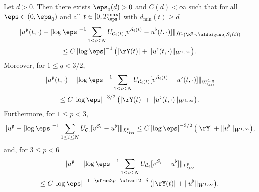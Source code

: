 \begin{Proposition} \label{pro:u^p.U}
Let $d>0$. Then there exists $\eps_0(d) > 0$ and $C(d) < \infty$ such that for all $\eps \in (0,\eps_0)$ and all $t \in [0,T_\eps^{\max}]$
with $d_{\min}(t) \geq d$
\begin{multline} \label{est:fluid.velocities.-1}
\|u^\mathfrak{p}(t,\cdot) - \left|\log \eps\right|^{-1} \sum_{1 \leq i \leq N} U_{\mathcal C_i(t)}[v^{{\mathcal S}_i(t)} - u^\flat(t,\cdot)]\|_{\dot H^{1} (\R^3 \smallsetminus \oldbigcup_i {\mathcal S}_i(t)) }
\\
\leq C \left|\log \eps\right|^{-1} \big(|\rY(t)|_{} + \|u^\flat(t,\cdot)\|_{W^{1,\infty}} \big).
\end{multline}
Moreover, for $1 \leq q < 3/2$,
\begin{multline} \label{est:fluid.velocities.0}
\|u^\mathfrak{p}(t,\cdot) - \left|\log \eps\right|^{-1} \sum_{1 \leq i \leq N} U_{\mathcal C_i(t)}[v^{{\mathcal S}_i(t)} - u^\flat(t,\cdot)]\|_{W^{1,q}_{\loc}}
\\ \leq C \left|\log \eps\right|^{-3/2} \big(|\rY(t)|_{} + \|u^\flat(t,\cdot)\|_{W^{1,\infty}} \big).
\end{multline}
Furthermore, for $1 \leq p< 3$,
\begin{equation} \label{est:fluid.velocities.1}
\|u^\mathfrak{p} - \left|\log \eps\right|^{-1} \sum_{1 \leq i \leq N} U_{\mathcal C_i}[v^{{\mathcal S}_i} - u^\flat]\|_{L^p_{\loc}} \leq C \left|\log \eps\right|^{-3/2} \big(|\rY|_{} + \|u^\flat\|_{W^{1,\infty}} \big),
\end{equation}
and, for $3 \leq p < 6$
\begin{multline} \label{est:fluid.velocities.comment}
\|u^\mathfrak{p} - \left|\log \eps\right|^{-1} \sum_{1 \leq i \leq N} U_{\mathcal C_i}[v^{{\mathcal S}_i} - u^\flat]\|_{L^p_{\loc}}\\
\leq C \left|\log \eps\right|^{-1 + {\sfrac 3 p - \sfrac 1 2 - \delta}} \big(|\rY(t)|_{} + \|u^\flat\|_{W^{1,\infty}} \big).
\end{multline}
\end{Proposition}
